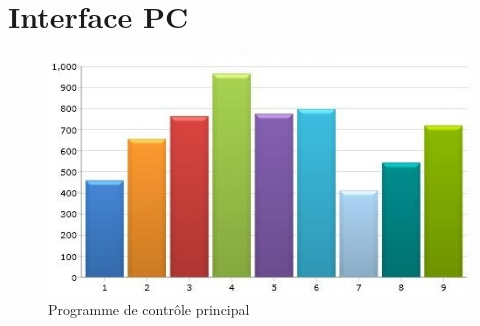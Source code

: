 \documentclass[10pt,a4paper,final]{article}
\begin{document}
\begin{spacing}{1.5}
\begin{multicols}{3}
\\
\end{multicols}
\vfill
\pagebreak
\section{Interface PC}

\begin{figure}[hbtp]
\caption{Programme de contrôle principal}
\centering
\includegraphics[scale=0.7]{Images/Bolid.jpg}
\end{figure}


\end{spacing}
\end{document}
